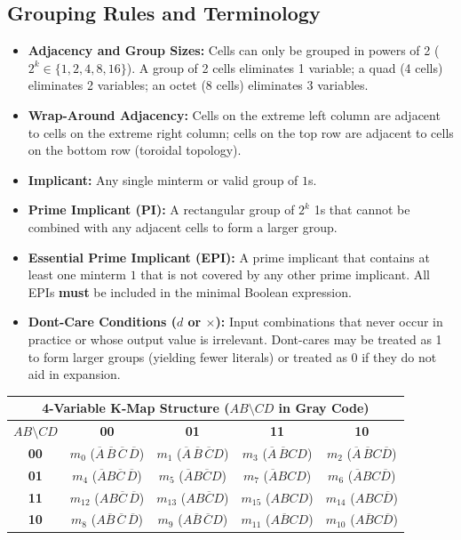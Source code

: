 \subsection{Grouping Rules and Terminology}
\begin{itemize}
    \item \textbf{Adjacency and Group Sizes:} Cells can only be grouped in powers of 2 ($2^k \in \{1, 2, 4, 8, 16\}$). A group of 2 cells eliminates 1 variable; a quad (4 cells) eliminates 2 variables; an octet (8 cells) eliminates 3 variables.
    \item \textbf{Wrap-Around Adjacency:} Cells on the extreme left column are adjacent to cells on the extreme right column; cells on the top row are adjacent to cells on the bottom row (toroidal topology).
    \item \textbf{Implicant:} Any single minterm or valid group of $1$s.
    \item \textbf{Prime Implicant (PI):} A rectangular group of $2^k$ 1s that cannot be combined with any adjacent cells to form a larger group.
    \item \textbf{Essential Prime Implicant (EPI):} A prime implicant that contains at least one minterm $1$ that is not covered by any other prime implicant. All EPIs \textbf{must} be included in the minimal Boolean expression.
    \item \textbf{Don\textquotesingle t-Care Conditions ($d$ or $\times$):} Input combinations that never occur in practice or whose output value is irrelevant. Don\textquotesingle t-cares may be treated as 1 to form larger groups (yielding fewer literals) or treated as 0 if they do not aid in expansion.
\end{itemize}

\begin{center}
\begin{tabularx}{\textwidth}{c | c c c c}
\toprule
\multicolumn{5}{c}{\textbf{4-Variable K-Map Structure ($AB \setminus CD$ in Gray Code)}} \\
\midrule
$AB \setminus CD$ & \textbf{00} & \textbf{01} & \textbf{11} & \textbf{10} \\
\midrule
\textbf{00} & $m_0$ ($\overline{A}\,\overline{B}\,\overline{C}\,\overline{D}$) & $m_1$ ($\overline{A}\,\overline{B}\,\overline{C}D$) & $m_3$ ($\overline{A}\,\overline{B}CD$) & $m_2$ ($\overline{A}\,\overline{B}C\overline{D}$) \\
\textbf{01} & $m_4$ ($\overline{A}B\overline{C}\,\overline{D}$) & $m_5$ ($\overline{A}B\overline{C}D$) & $m_7$ ($\overline{A}BCD$) & $m_6$ ($\overline{A}BC\overline{D}$) \\
\textbf{11} & $m_{12}$ ($AB\overline{C}\,\overline{D}$) & $m_{13}$ ($AB\overline{C}D$) & $m_{15}$ ($ABCD$) & $m_{14}$ ($ABC\overline{D}$) \\
\textbf{10} & $m_8$ ($A\overline{B}\,\overline{C}\,\overline{D}$) & $m_9$ ($A\overline{B}\,\overline{C}D$) & $m_{11}$ ($A\overline{B}CD$) & $m_{10}$ ($A\overline{B}C\overline{D}$) \\
\bottomrule
\end{tabularx}
\end{center}

